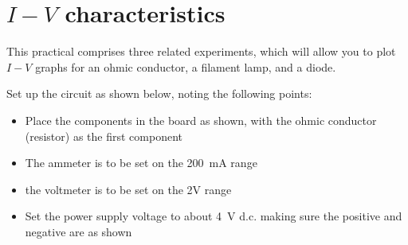 \section{$I-V$ characteristics}
\label{ivchar}

This practical comprises three related experiments, which will allow you to plot $I-V$ graphs for an ohmic conductor, a filament lamp, and a diode.

Set up the circuit as shown below, noting the following points:
\begin{itemize}
\item Place the components in the board as shown, with the ohmic conductor (resistor) as the first component
\item The ammeter is to be set on the \SI{200}{mA} range
\item the voltmeter is to be set on the 2V range
\item Set the power supply voltage to about \SI{4}{V} d.c. making sure the positive and negative are as shown
\end{itemize}

\begin{center}
\end{center}

